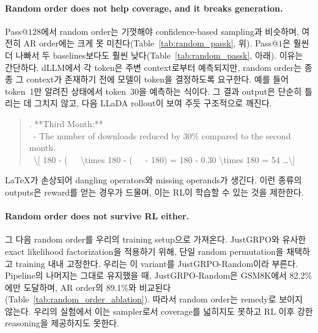 \paragraph{Random order does not help coverage, and it breaks generation.}
Pass@$128$에서 random order는 기껏해야 confidence-based sampling과 비슷하며, 여전히 AR order에는 크게 못 미친다(Table~\ref{tab:random_passk}, 위). Pass@$1$은 훨씬 더 나빠서 두 baselines보다도 훨씬 낮다(Table~\ref{tab:random_passk}, 아래). 이유는 간단하다. dLLM에서 각 token은 주변 context로부터 예측되지만, random order는 종종 그 context가 존재하기 전에 모델이 token을 결정하도록 요구한다. 예를 들어 token~1만 알려진 상태에서 token~30을 예측하는 식이다. 그 결과 output은 단순히 틀리는 데 그치지 않고, 다음 LLaDA rollout이 보여 주듯 구조적으로 깨진다.

\begin{quote}
    \small{}. **Third Month:**\\
    \ - The number of downloads reduced by 30\% compared to the second month.\\
    \ \textbackslash[ 180 - (\ \ \ \textbackslash times 180 - (\ \ \ - 180) = 180 - 0.30 \textbackslash times 180 = 54 \ldots \textbackslash]
\end{quote}

LaTeX가 손상되어 dangling operators와 missing operands가 생긴다. 이런 종류의 outputs은 reward를 얻는 경우가 드물며, 이는 RL이 학습할 수 있는 것을 제한한다.

\paragraph{Random order does not survive RL either.}
그 다음 random order를 우리의 training setup으로 가져온다. JustGRPO와 유사한 exact likelihood factorization을 적용하기 위해, 단일 random permutation을 채택하고 training 내내 고정한다. 우리는 이 variant를 JustGRPO-Random이라 부른다. Pipeline의 나머지는 그대로 유지했을 때, JustGRPO-Random은 GSM8K에서 82.2\%에만 도달하며, AR order의 89.1\%와 비교된다(Table~\ref{tab:random_order_ablation}). 따라서 random order는 remedy로 보이지 않는다. 우리의 실험에서 이는 sampler로서 coverage를 넓히지도 못하고 RL 이후 강한 reasoning을 제공하지도 못한다.


